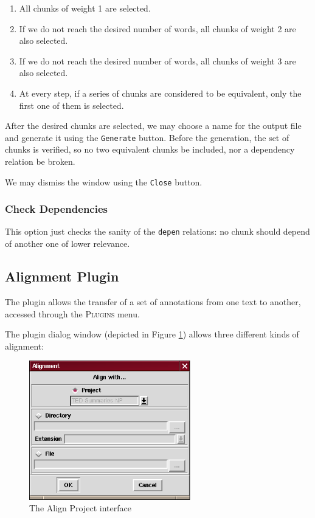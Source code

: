 \documentclass{article}
\begin{document}
\begin{enumerate}
\item All chunks of weight 1 are selected.
\item If we do not reach the desired number of words, all chunks of
weight 2 are also selected.
\item If we do not reach the desired number of words, all chunks of
weight 3 are also selected.
\item At every step, if a series of chunks are considered to be
equivalent, only the first one of them is selected.
\end{enumerate}

After the desired chunks are selected, we may choose a name for the
output file and generate it using the \texttt{Generate} button. Before
the generation, the set of chunks is verified, so no two equivalent
chunks be included, nor a dependency relation be broken.

We may dismiss the window using the \texttt{Close} button.

\subsubsection{Check Dependencies}
This option just checks the sanity of the \texttt{depen} relations: no
chunk should depend of another one of lower relevance.

\subsection{Alignment Plugin}
\label{sec:alignplugin}
The plugin allows the transfer of a set of annotations from one text
to another, accessed through the \textsc{Plugins} menu.

The plugin dialog window (depicted in Figure \ref{fig:alignplug})
allows three different kinds of alignment:

\begin{figure}[ht]
\begin{center}
\includegraphics[width=70mm]{img/alignplugin.eps}
\caption{The Align Project interface}
\label{fig:alignplug}
\end{center}
\end{figure}
\end{document}
